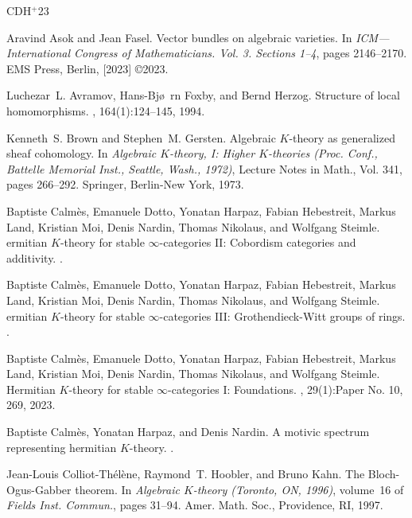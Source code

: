 \documentclass[10pt,twoside,a4paper,reqno]{amsart}
\theoremstyle{definition}
\numberwithin{equation}{section}
\renewcommand{\|}{\operatorname{|}}
\begin{document}
\newcommand{\etalchar}[1]{$^{#1}$}
\begin{thebibliography}{CDH{\etalchar{+}}23}

Aravind Asok and Jean Fasel.
\newblock Vector bundles on algebraic varieties.
\newblock In {\em I{CM}---{I}nternational {C}ongress of {M}athematicians.
  {V}ol. 3. {S}ections 1--4}, pages 2146--2170. EMS Press, Berlin, [2023]
  \copyright 2023.

Luchezar~L. Avramov, Hans-Bj\o~rn Foxby, and Bernd Herzog.
\newblock Structure of local homomorphisms.
, 164(1):124--145, 1994.

Kenneth~S. Brown and Stephen~M. Gersten.
\newblock Algebraic {$K$}-theory as generalized sheaf cohomology.
\newblock In {\em Algebraic {$K$}-theory, {I}: {H}igher {$K$}-theories ({P}roc.
  {C}onf., {B}attelle {M}emorial {I}nst., {S}eattle, {W}ash., 1972)}, Lecture
  Notes in Math., Vol. 341, pages 266--292. Springer, Berlin-New York, 1973.

\bibitem[CDH{\etalchar{+}}a]{CDH+II}
Baptiste Calm\`es, Emanuele Dotto, Yonatan Harpaz, Fabian Hebestreit, Markus
  Land, Kristian Moi, Denis Nardin, Thomas Nikolaus, and Wolfgang Steimle.
ermitian ${K}$-theory for stable $\infty$-categories {II}:
  {C}obordism categories and additivity.
.

\bibitem[CDH{\etalchar{+}}b]{CDH+III}
Baptiste Calm\`es, Emanuele Dotto, Yonatan Harpaz, Fabian Hebestreit, Markus
  Land, Kristian Moi, Denis Nardin, Thomas Nikolaus, and Wolfgang Steimle.
ermitian ${K}$-theory for stable $\infty$-categories {III}:
  {G}rothendieck-{W}itt groups of rings.
.

\bibitem[CDH{\etalchar{+}}23]{CDH+I}
Baptiste Calm\`es, Emanuele Dotto, Yonatan Harpaz, Fabian Hebestreit, Markus
  Land, Kristian Moi, Denis Nardin, Thomas Nikolaus, and Wolfgang Steimle.
\newblock Hermitian {$K$}-theory for stable {$\infty$}-categories {I}:
  {F}oundations.
, 29(1):Paper No. 10, 269, 2023.

Baptiste Calm\`es, Yonatan Harpaz, and Denis Nardin.
\newblock A motivic spectrum representing hermitian {$K$}-theory.
.

Jean-Louis Colliot-Th\'{e}l\`ene, Raymond~T. Hoobler, and Bruno Kahn.
\newblock The {B}loch-{O}gus-{G}abber theorem.
\newblock In {\em Algebraic {$K$}-theory ({T}oronto, {ON}, 1996)}, volume~16 of
  {\em Fields Inst. Commun.}, pages 31--94. Amer. Math. Soc., Providence, RI,
  1997.


\end{thebibliography}
\end{document}
